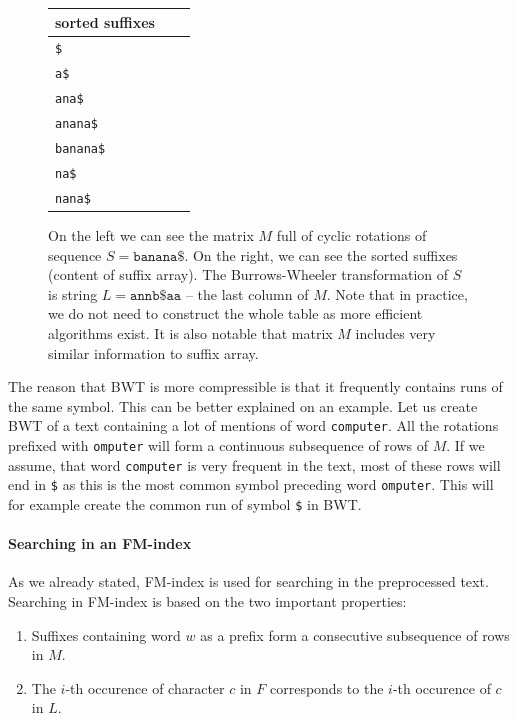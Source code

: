 \begin{figure}
{	\begin{tabular}{l l l}
		sorted suffixes\\
	\hline
		\tt \$ \\
		\tt a\$ \\
		\tt ana\$ \\
		\tt anana\$ \\
		\tt banana\$ \\
		\tt na\$ \\
		\tt nana\$ \\
	\end{tabular}
	}
	\caption[TODO]{On the left we can see the matrix $M$ full of cyclic rotations of sequence
	$S = \mathtt{banana\$}$. On the right, we can see the sorted suffixes (content of suffix array). The
	Burrows-Wheeler transformation of $S$ is string $L=\mathtt{annb\$aa}$ -- the last column of $M$.
	Note that in practice, we do not need to construct the whole table as more efficient algorithms exist.
	It is also notable that matrix $M$ includes very similar information to suffix array.
	}
	\label{obr:BWT}
\end{figure}

The reason that BWT is more compressible is that it frequently contains runs of the same
symbol. This can be better explained on an example. Let us create BWT of a text containing
a lot of mentions of word {\tt computer}. All the rotations prefixed with {\tt omputer} will form a
continuous subsequence of rows of $M$. If we assume, that word {\tt computer} is very frequent
in the text, most of these rows will end in {\tt \$} as this is the most common symbol preceding
word {\tt omputer}. This will for example create the common run of symbol {\tt \$} in BWT.

\paragraph{Searching in an FM-index}

As we already stated, FM-index is used for searching in the preprocessed text.
Searching in FM-index is based on the two important properties:

\begin{enumerate}
	\item Suffixes containing word $w$ as a prefix form a consecutive subsequence of rows in $M$.
	\label{chapter1:fmindexprop:prop1}
	\item The $i$-th occurence of character $c$ in $F$ corresponds to the $i$-th occurence of $c$ in $L$.
	\label{chapter1:fmindexprop:prop2}
\end{enumerate}


